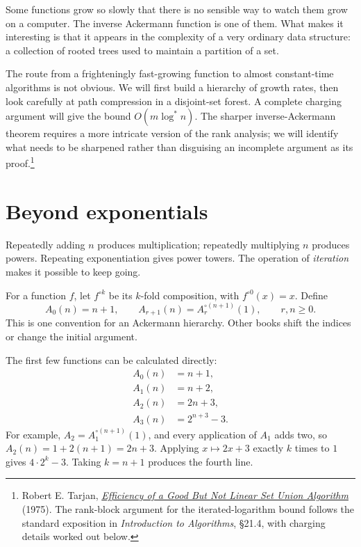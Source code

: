 
Some functions grow so slowly that there is no sensible way to watch them grow on a computer. The inverse Ackermann function is one of them. What makes it interesting is that it appears in the complexity of a very ordinary data structure: a collection of rooted trees used to maintain a partition of a set.

The route from a frighteningly fast-growing function to almost constant-time algorithms is not obvious. We will first build a hierarchy of growth rates, then look carefully at path compression in a disjoint-set forest. A complete charging argument will give the bound \(O(m\log^*n)\). The sharper inverse-Ackermann theorem requires a more intricate version of the rank analysis; we will identify what needs to be sharpened rather than disguising an incomplete argument as its proof.\footnote{Robert E. Tarjan, \href{https://doi.org/10.1145/321879.321884}{\emph{Efficiency of a Good But Not Linear Set Union Algorithm}} (1975). The rank-block argument for the iterated-logarithm bound follows the standard exposition in \emph{Introduction to Algorithms}, §21.4, with charging details worked out below.}

\section{Beyond exponentials}

Repeatedly adding \(n\) produces multiplication; repeatedly multiplying \(n\) produces powers. Repeating exponentiation gives power towers. The operation of \emph{iteration} makes it possible to keep going.

For a function \(f\), let \(f^{\circ k}\) be its \(k\)-fold composition, with \(f^{\circ0}(x)=x\). Define
\begin{equation}
 A_0(n)=n+1,\qquad
 A_{r+1}(n)=A_r^{\circ(n+1)}(1),
 \qquad r,n\geq0.
 \label{eq:N20261108-hierarchy}
\end{equation}
This is one convention for an Ackermann hierarchy. Other books shift the indices or change the initial argument.

The first few functions can be calculated directly:
\begin{align*}
 A_0(n)&=n+1,\\
 A_1(n)&=n+2,\\
 A_2(n)&=2n+3,\\
 A_3(n)&=2^{n+3}-3.
\end{align*}
For example, \(A_2=A_1^{\circ(n+1)}(1)\), and every application of \(A_1\) adds two, so \(A_2(n)=1+2(n+1)=2n+3\). Applying \(x\mapsto2x+3\) exactly \(k\) times to \(1\) gives \(4\cdot2^k-3\). Taking \(k=n+1\) produces the fourth line.

